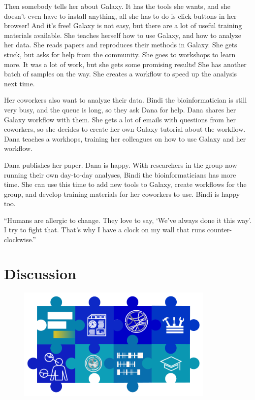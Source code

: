 \begin{center}
{Then somebody tells her about Galaxy.
It has the tools she wants, and she doesn't even have to install anything, all she has to do is click buttons in her browser!
And it's free!
Galaxy is not easy, but there are a lot of useful training materials available.
She teaches herself how to use Galaxy, and how to analyze her data. She reads papers and reproduces their methods in Galaxy.
She gets stuck, but asks for help from the community.
She goes to workshops to learn more.
It was a lot of work, but she gets some promising results! She has another batch of samples on the way. She creates a workflow to speed up the analysis next time.

Her coworkers also want to analyze their data.
Bindi the bioinformatician is still very busy, and the queue is long, so they ask Dana for help.
Dana shares her Galaxy workflow with them.
She gets a lot of emails with questions from her coworkers, so she decides to create her own Galaxy tutorial about the workflow.
Dana teaches a workhops, training her colleagues on how to use Galaxy and her workflow.

Dana publishes her paper. Dana is happy.
With researchers in the group now running their own day-to-day analyses, Bindi the bioinformaticians has more time.
She can use this time to add new tools to Galaxy, create workflows for the group, and develop training materials for her coworkers to use. Bindi is happy too.
\normalsize
}
\end{center}

\cleartorightpage

\begin{savequote}[75mm]
``Humans are allergic to change. They love to say, `We've always done it this way'. I try to fight that. That's why I have a clock on my wall that runs counter-clockwise.''
\end{savequote}

\chapter{Discussion}\label{discussion}
\setcounter{figure}{-1}
\setcounter{table}{-1}
\setcounter{section}{-1}
\setcounter{NAT@ctr}{-1}

\begin{figure}[t!]
\includegraphics[height=15em]{frontmatter/images/chapter-header-discussion-tools.png}
\end{figure}
\setcounter{figure}{-1}
\setcounter{table}{-1}
\setcounter{section}{-1}


